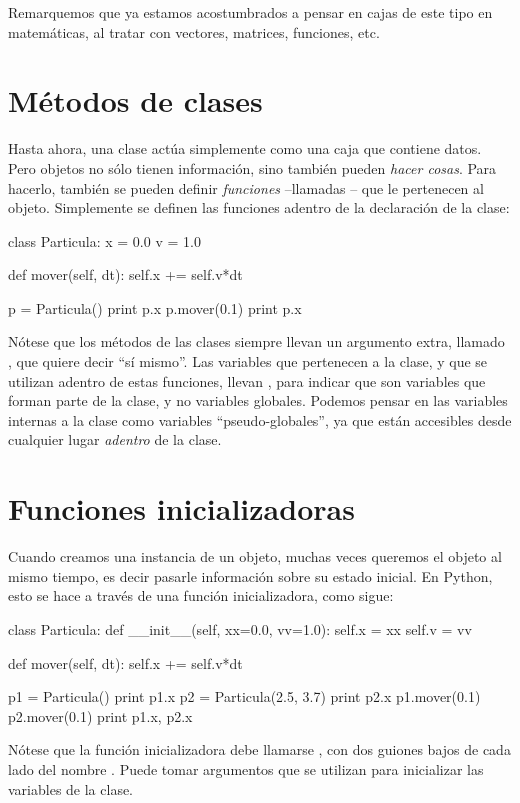 Remarquemos que ya estamos acostumbrados a pensar en cajas de este tipo en matemáticas, al tratar con vectores, matrices, funciones, etc.

\section{Métodos de clases}

Hasta ahora, una clase actúa simplemente como una caja que contiene datos.  
Pero objetos no sólo tienen información, sino también pueden \emph{hacer cosas}.
Para hacerlo, también se pueden definir \emph{funciones} --llamadas -- que le pertenecen al objeto.  
Simplemente se definen las funciones adentro de la declaración de la clase:
\begin{python}
class Particula:
  x = 0.0
  v = 1.0
  
  def mover(self, dt):
    self.x += self.v*dt

p = Particula()
print p.x
p.mover(0.1)
print p.x
\end{python}

Nótese que los métodos de las clases siempre llevan un argumento extra, llamado , que quiere decir ``sí mismo''.
Las variables que  pertenecen a la clase, y que se utilizan adentro de estas funciones, llevan , para indicar que son variables que forman parte de la clase, y no variables globales. Podemos pensar en las variables internas a la clase como variables ``pseudo-globales'', ya que están accesibles desde cualquier lugar \emph{adentro} de la clase.


\section{Funciones inicializadoras}
Cuando creamos una instancia de un objeto, muchas veces queremos  el objeto al mismo tiempo, es decir pasarle información sobre su estado inicial. En Python, esto se hace a través de una función inicializadora, como sigue:
\begin{python}
class Particula:
  def __init__(self, xx=0.0, vv=1.0):
    self.x = xx
    self.v = vv
  
  def mover(self, dt):
    self.x += self.v*dt

p1 = Particula()
print p1.x
p2 = Particula(2.5, 3.7)
print p2.x
p1.mover(0.1)
p2.mover(0.1)
print p1.x, p2.x
\end{python}
Nótese que la función inicializadora debe llamarse , con dos guiones bajos de cada lado del nombre .
Puede tomar argumentos que se utilizan para inicializar las variables de la clase.

